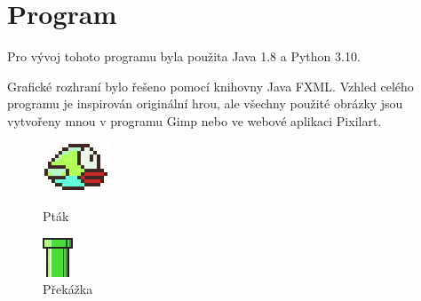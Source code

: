 \section{Program}
Pro vývoj tohoto programu byla použita Java 1.8 a Python 3.10.

Grafické rozhraní bylo řešeno pomocí knihovny Java FXML. Vzhled celého programu je inspirován originální hrou, ale všechny použité obrázky jsou vytvořeny mnou v programu Gimp nebo ve webové aplikaci Pixilart.

\begin{figure}[!htb]
   \begin{minipage}{0.4\textwidth}
     \centering
     \includegraphics[width=.7\linewidth]{images/Bird.png}
     \caption{Pták}\label{Fig:Data1}
   \end{minipage}\hfill
   \begin{minipage}{0.4\textwidth}
     \centering
     \includegraphics[width=.7\linewidth]{images/BottomPillar.png}
     \caption{Překážka}\label{Fig:Data2}
   \end{minipage}
\end{figure}

